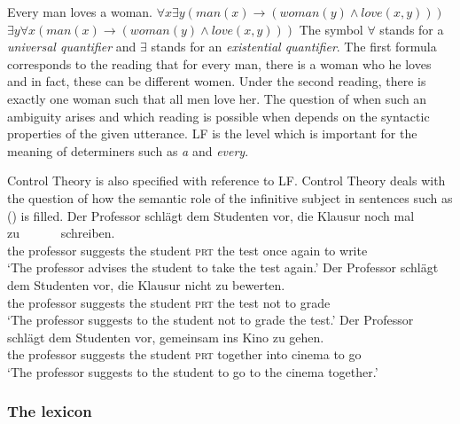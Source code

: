 \eal
\label{Beispiel-Every-man-loves-a-woman}
\ex Every man loves a woman.
\ex $\forall x \exists y (man(x) \to (woman(y) \wedge love(x,y)))$
\ex $\exists y \forall x (man(x) \to (woman(y) \wedge love(x,y)))$
\zl
The symbol $\forall$\is{$\forall$} stands for a \emph{universal quantifier} and $\exists$\is{$\exists$} stands for an
\emph{existential quantifier}. The first formula corresponds to the reading that for every man, there is a woman who he loves
and in fact, these can be different women. Under the second reading, there is exactly one woman such that all men love her. The question of when such an
ambiguity arises and which reading is possible when depends on the syntactic properties of the given utterance. LF is the level which is important for the
meaning of determiners such as \emph{a} and \emph{every}.

Control Theory is also specified with reference to LF. Control Theory deals with the question of how the semantic role of the infinitive
subject in sentences such as () is filled.
\eal
\ex 
\gll Der Professor schlägt dem Studenten vor, die Klausur noch mal zu~~~~~~ schreiben.\\
	 the professor suggests the student \textsc{prt} the test once again to write\\
\glt `The professor advises the student to take the test again.'
\ex 
\gll Der Professor schlägt dem Studenten vor, die Klausur nicht zu bewerten.\\
	 the professor suggests the student \textsc{prt} the test not to grade\\
\glt `The professor suggests to the student not to grade the test.'
\ex 
\gll Der Professor schlägt dem Studenten vor, gemeinsam ins Kino zu gehen.\hspace{-3pt}\\
	 the professor suggests the student \textsc{prt} together into cinema to go\\
\glt `The professor suggests to the student to go to the cinema together.'
\zl
{}

\subsubsection{The lexicon}
\label{Abschnitt-GB-Lexikon}

